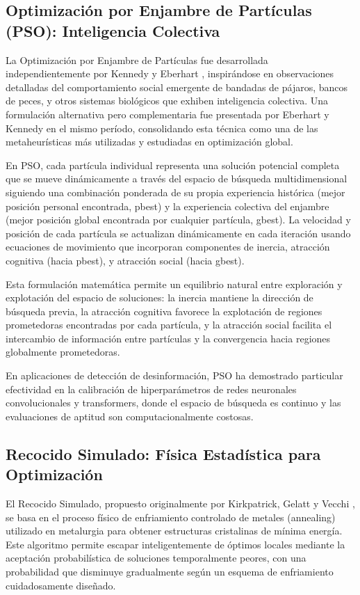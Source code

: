\subsection{Optimización por Enjambre de Partículas (PSO): Inteligencia Colectiva}

La Optimización por Enjambre de Partículas fue desarrollada independientemente por Kennedy y Eberhart \cite{kennedy1995particle}, inspirándose en observaciones detalladas del comportamiento social emergente de bandadas de pájaros, bancos de peces, y otros sistemas biológicos que exhiben inteligencia colectiva. Una formulación alternativa pero complementaria fue presentada por Eberhart y Kennedy \cite{eberhart1995particle} en el mismo período, consolidando esta técnica como una de las metaheurísticas más utilizadas y estudiadas en optimización global.

En PSO, cada partícula individual representa una solución potencial completa que se mueve dinámicamente a través del espacio de búsqueda multidimensional siguiendo una combinación ponderada de su propia experiencia histórica (mejor posición personal encontrada, pbest) y la experiencia colectiva del enjambre (mejor posición global encontrada por cualquier partícula, gbest). La velocidad y posición de cada partícula se actualizan dinámicamente en cada iteración usando ecuaciones de movimiento que incorporan componentes de inercia, atracción cognitiva (hacia pbest), y atracción social (hacia gbest).

Esta formulación matemática permite un equilibrio natural entre exploración y explotación del espacio de soluciones: la inercia mantiene la dirección de búsqueda previa, la atracción cognitiva favorece la explotación de regiones prometedoras encontradas por cada partícula, y la atracción social facilita el intercambio de información entre partículas y la convergencia hacia regiones globalmente prometedoras.

En aplicaciones de detección de desinformación, PSO ha demostrado particular efectividad en la calibración de hiperparámetros de redes neuronales convolucionales y transformers, donde el espacio de búsqueda es continuo y las evaluaciones de aptitud son computacionalmente costosas.

\subsection{Recocido Simulado: Física Estadística para Optimización}

El Recocido Simulado, propuesto originalmente por Kirkpatrick, Gelatt y Vecchi \cite{kirkpatrick1983optimization}, se basa en el proceso físico de enfriamiento controlado de metales (annealing) utilizado en metalurgia para obtener estructuras cristalinas de mínima energía. Este algoritmo permite escapar inteligentemente de óptimos locales mediante la aceptación probabilística de soluciones temporalmente peores, con una probabilidad que disminuye gradualmente según un esquema de enfriamiento cuidadosamente diseñado.


